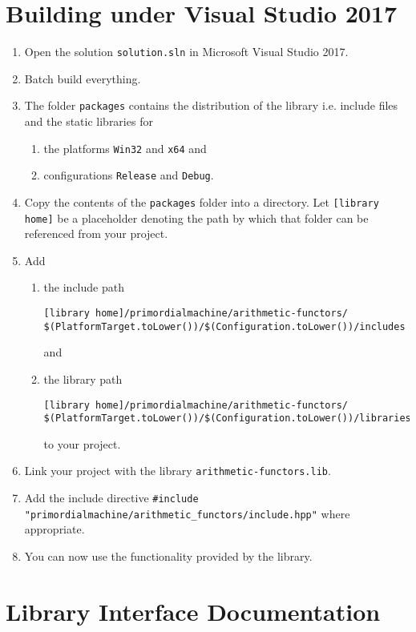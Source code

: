 \documentclass[oneside]{report}
\begin{document}
\chapter{Building under Visual Studio 2017}
\begin{enumerate}
\item Open the solution \texttt{solution.sln} in Microsoft Visual Studio 2017.
\item Batch build everything.
\item The folder \texttt{packages} contains the distribution of the library i.e. include files and the
      static libraries for
  \begin{enumerate}
    \item the platforms \texttt{Win32} and \texttt{x64} and
    \item configurations \texttt{Release} and \texttt{Debug}.
  \end{enumerate}
\item Copy the contents of the \verb+packages+ folder into a directory. Let
      \verb+[library home]+ be a placeholder denoting the path by which that folder
      can be referenced from your project.
\item Add
  \begin{enumerate}
    \item the include path
\begin{verbatim}
[library home]/primordialmachine/arithmetic-functors/
$(PlatformTarget.toLower())/$(Configuration.toLower())/includes
\end{verbatim}
	and
    \item the library path
\begin{verbatim}
[library home]/primordialmachine/arithmetic-functors/
$(PlatformTarget.toLower())/$(Configuration.toLower())/libraries
\end{verbatim}
    to your project.
\end{enumerate}
\item Link your project with the library \verb+arithmetic-functors.lib+.
\item Add the include directive \verb+#include "primordialmachine/arithmetic_functors/include.hpp"+ where appropriate.
\item You can now use the functionality provided by the library.
\end{enumerate}

\chapter{Library Interface Documentation}
\end{document}

